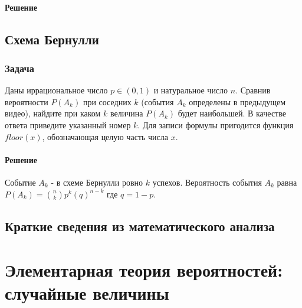\documentclass[a4paper,12pt]{article}
\begin{document}
\paragraph{Решение}


\subsection{Схема Бернулли}
\subsubsection*{Задача}
Даны иррациональное число \(p \in (0,1)\) и натуральное число \(n\). Сравнив вероятности \(P(A_k)\) при соседних \(k\) (события \(A_k\) определены в предыдущем видео), найдите при каком \(k\) величина \(P(A_k)\) будет наибольшей. В качестве ответа приведите указанный номер \(k\). Для записи формулы пригодится функция \(floor(x)\), обозначающая целую часть числа \(x\).
\paragraph{Решение}
Событие \(A_k\) - в схеме Бернулли ровно \(k\) успехов. Вероятность события \(A_k\) равна \(P(A_k)=\binom{n}{k}p^k(q)^{n-k}\) где \(q=1-p\).



\subsection{Краткие сведения из математического анализа}


\section{Элементарная теория вероятностей: случайные величины}
\end{document}
